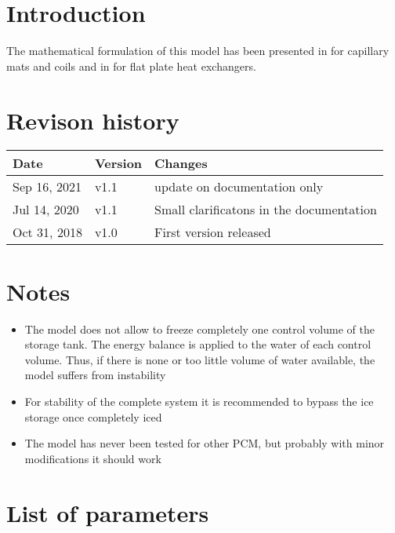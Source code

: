 \documentclass[english]{SPFReport}
\author{Dr. Daniel Carbonell}
\begin{document}
 


\section{Introduction}

The mathematical formulation of this model has been presented in \citet{carbonell_experimental_2018} for capillary mats and coils and in \citet{ICEEX_2017} for flat plate heat exchangers.

\section{Revison history}

  \begin{tabular}{|p{40mm}|p{15mm}|p{101mm}|}\hline    
    \textbf{Date} & \textbf{Version} & \textbf{Changes}  \\\hline
     Sep 16, 2021 & v1.1 & update on documentation only \\\hline    
     Jul 14, 2020 & v1.1 & Small clarificatons in the documentation \\\hline    
     Oct 31, 2018 & v1.0 & First version released \\\hline
  \end{tabular}

\section{Notes}

\begin{itemize}
\item The model does not allow to freeze completely one control volume of the storage tank. The energy balance is applied to the water of each control volume. Thus, if there is none or too little volume of water available, the model suffers from instability
\item For stability of the complete system it is recommended to bypass the ice storage once completely iced
\item The model has never been tested for other PCM, but probably with minor modifications it should work
\end{itemize}

\section{List of parameters}
\end{document}
